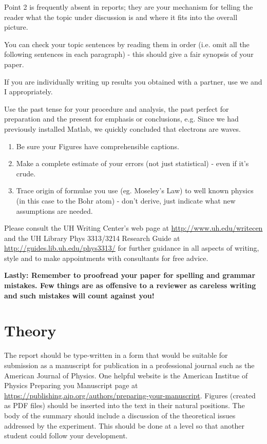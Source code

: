 \documentclass[aps,twocolumn,secnumarabic,nobalancelastpage,amsmath,amssymb,nofootinbib]{revtex4}
\begin{document}
Point 2 is frequently absent in reports; they are your
mechanism for telling the reader what the topic under discussion is
and where it fits into the overall picture.

You can check your topic sentences by reading them in order (i.e.
omit all the following sentences in each paragraph) - this should
give a fair synopsis of your paper.

If you are individually writing up results you obtained with a
partner, use we and I appropriately.

Use the past tense for your procedure and analysis, the past perfect
for preparation and the present for emphasis or conclusions, e.g.
Since we had previously installed Matlab, we quickly concluded that
electrons are waves.

\begin{enumerate}
\item Be sure your Figures have comprehensible captions.

\item Make a complete estimate of your errors (not just statistical) - even
if it's crude.

\item Trace origin of formulae you use (eg. Moseley's Law) to well known
physics (in this case to the Bohr atom) - don't derive, just
indicate what new assumptions are needed.
\end{enumerate}

Please consult the UH  Writing 
Center's web page at \url{http://www.uh.edu/writecen} and the UH Library Phys 3313/3214 
Research Guide at \url{http://guides.lib.uh.edu/phys3313/}  for further
guidance in all aspects of writing, style and to make appointments
with consultants for free advice.  

{\bf Lastly: Remember to proofread your paper for spelling and grammar
 mistakes.  Few things are as offensive to a reviewer as careless
 writing and such mistakes will count against you!}


\section{Theory}

The report should be type-written in a form that would be suitable
for submission as a manuscript for publication in a professional
journal such as the American Journal of Physics.  One helpful website is the American 
Institue of Physics Preparing you Manuscript page at
\url{https://publishing.aip.org/authors/preparing-your-manuscript}.  Figures (created as PDF files)
should be inserted into the text in their natural positions. The
body of the summary should include a discussion of the theoretical
issues addressed by the experiment.  This should be done at a level
so that another student could follow your development.
\end{document}
